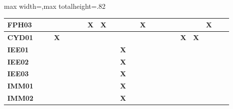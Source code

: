 \begin{center}
\begin{adjustbox}{max width=\textwidth,max totalheight=.82\textheight}
\begin{tabular}{|l|c|c|c|c|c|c|c|c|c|c|c|c|c|c|c|c|c|c|c|c|c|}
\rowcolor{azulClaro}
\textcolor{azulTEC}{\textbf{FPH03}} & \textbf{ } & \textbf{ } & \textbf{ } & \textbf{ } & \textbf{ } & \textbf{ } & \textbf{X} & \textbf{X} & \textbf{ } & \textbf{ } & \textbf{ } & \textbf{X} & \textbf{ } & \textbf{ } & \textbf{ } & \textbf{ } & \textbf{ } & \textbf{ } & \textbf{X} & \textbf{ } & \textbf{ } \\ \hline
\rowcolor{azulClaro}
\textcolor{azulTEC}{\textbf{CYD01}} & \textbf{ } & \textbf{ } & \textbf{X} & \textbf{ } & \textbf{ } & \textbf{ } & \textbf{ } & \textbf{ } & \textbf{ } & \textbf{ } & \textbf{ } & \textbf{ } & \textbf{ } & \textbf{ } & \textbf{ } & \textbf{ } & \textbf{X} & \textbf{X} & \textbf{ } & \textbf{ } & \textbf{ } \\ \hline
\rowcolor{azulClaro}
\textcolor{azulTEC}{\textbf{IEE01}} & \textbf{ } & \textbf{ } & \textbf{ } & \textbf{ } & \textbf{ } & \textbf{ } & \textbf{ } & \textbf{ } & \textbf{ } & \textbf{X} & \textbf{ } & \textbf{ } & \textbf{ } & \textbf{ } & \textbf{ } & \textbf{ } & \textbf{ } & \textbf{ } & \textbf{ } & \textbf{ } & \textbf{ } \\ \hline
\rowcolor{azulClaro}
\textcolor{azulTEC}{\textbf{IEE02}} & \textbf{ } & \textbf{ } & \textbf{ } & \textbf{ } & \textbf{ } & \textbf{ } & \textbf{ } & \textbf{ } & \textbf{ } & \textbf{X} & \textbf{ } & \textbf{ } & \textbf{ } & \textbf{ } & \textbf{ } & \textbf{ } & \textbf{ } & \textbf{ } & \textbf{ } & \textbf{ } & \textbf{ } \\ \hline
\rowcolor{azulClaro}
\textcolor{azulTEC}{\textbf{IEE03}} & \textbf{ } & \textbf{ } & \textbf{ } & \textbf{ } & \textbf{ } & \textbf{ } & \textbf{ } & \textbf{ } & \textbf{ } & \textbf{X} & \textbf{ } & \textbf{ } & \textbf{ } & \textbf{ } & \textbf{ } & \textbf{ } & \textbf{ } & \textbf{ } & \textbf{ } & \textbf{ } & \textbf{ } \\ \hline
\rowcolor{azulClaro}
\textcolor{azulTEC}{\textbf{IMM01}} & \textbf{ } & \textbf{ } & \textbf{ } & \textbf{ } & \textbf{ } & \textbf{ } & \textbf{ } & \textbf{ } & \textbf{ } & \textbf{X} & \textbf{ } & \textbf{ } & \textbf{ } & \textbf{ } & \textbf{ } & \textbf{ } & \textbf{ } & \textbf{ } & \textbf{ } & \textbf{ } & \textbf{ } \\ \hline
\rowcolor{azulClaro}
\textcolor{azulTEC}{\textbf{IMM02}} & \textbf{ } & \textbf{ } & \textbf{ } & \textbf{ } & \textbf{ } & \textbf{ } & \textbf{ } & \textbf{ } & \textbf{ } & \textbf{X} & \textbf{ } & \textbf{ } & \textbf{ } & \textbf{ } & \textbf{ } & \textbf{ } & \textbf{ } & \textbf{ } & \textbf{ } & \textbf{ } & \textbf{ } \\ \hline

\end{tabular}
\end{adjustbox}
\end{center}
